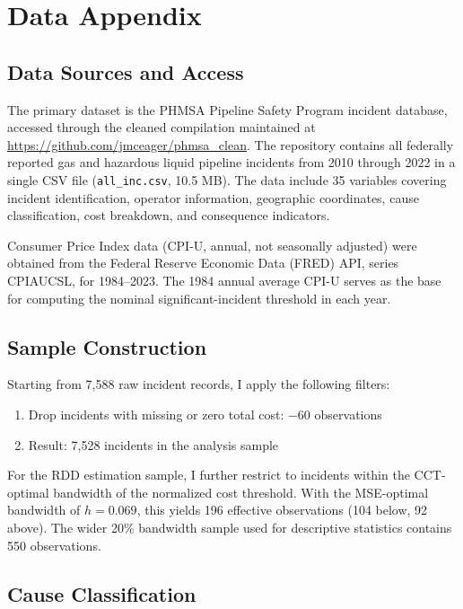 \documentclass[12pt]{article}
\begin{document}
\section{Data Appendix}
\label{sec:app_data}

\subsection{Data Sources and Access}

The primary dataset is the PHMSA Pipeline Safety Program incident database, accessed through the cleaned compilation maintained at \url{https://github.com/jmceager/phmsa_clean}. The repository contains all federally reported gas and hazardous liquid pipeline incidents from 2010 through 2022 in a single CSV file (\texttt{all\_inc.csv}, 10.5 MB). The data include 35 variables covering incident identification, operator information, geographic coordinates, cause classification, cost breakdown, and consequence indicators.

Consumer Price Index data (CPI-U, annual, not seasonally adjusted) were obtained from the Federal Reserve Economic Data (FRED) API, series CPIAUCSL, for 1984--2023. The 1984 annual average CPI-U serves as the base for computing the nominal significant-incident threshold in each year.

\subsection{Sample Construction}

Starting from 7,588 raw incident records, I apply the following filters:
\begin{enumerate}
\item Drop incidents with missing or zero total cost: $-60$ observations
\item Result: 7,528 incidents in the analysis sample
\end{enumerate}

For the RDD estimation sample, I further restrict to incidents within the CCT-optimal bandwidth of the normalized cost threshold. With the MSE-optimal bandwidth of $h = 0.069$, this yields 196 effective observations (104 below, 92 above). The wider 20\% bandwidth sample used for descriptive statistics contains 550 observations.

\subsection{Cause Classification}
\end{document}
